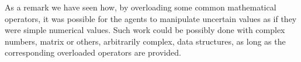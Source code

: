 As a remark we have seen how, by overloading some common mathematical operators, it was possible for the agents to manipulate uncertain values as if they were simple numerical values. Such work could be possibly done with complex numbers, matrix or others, arbitrarily complex, data structures, as long as the corresponding overloaded operators are provided.